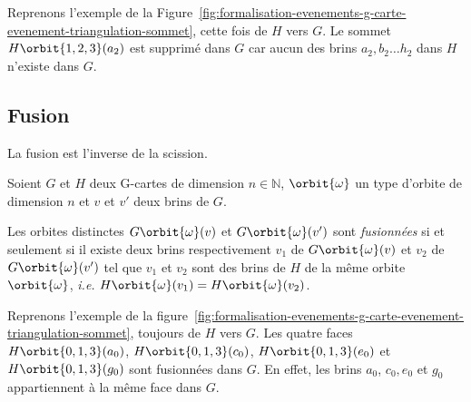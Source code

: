 Reprenons l'exemple de la
Figure~\ref{fig:formalisation-evenements-g-carte-evenement-triangulation-sommet},
cette fois de $H$ vers $G$. %
Le sommet $H\orbit{1,2,3}(a_{2})$ est supprimé dans $G$ car aucun des brins
$a_2,b_2\ldots h_2$ dans $H$ n'existe dans $G$. %


\subsection{Fusion}
\label{sec:formalisation-evenements-transfo-objets-fusion}


La fusion est l'inverse de la scission. %

\begin{definition}
	Soient $G$ et $H$ deux G-cartes de dimension $n \in \mathbb{N}$,
	$\orbit{\omega}$ un type d'orbite de dimension $n$ et $v$ et $v'$ deux brins de $G$. %

	Les orbites distinctes $G\orbit{\omega}(v)$ et $G\orbit{\omega}(v')$ sont
	\emph{fusionnées} si et seulement si il existe deux brins respectivement
	$v_{1}$ de $G\orbit{\omega}(v)$ et $v_{2}$ de $G\orbit{\omega}(v')$ tel que
	$v_{1}$ et $v_{2}$ sont des brins de $H$ de la même orbite $\orbit{\omega}$, \textit{i.e.}
	$H\orbit{\omega}(v_{1}) = H\orbit{\omega}(v_{2})$. %

\end{definition}


Reprenons l'exemple de la figure~\ref{fig:formalisation-evenements-g-carte-evenement-triangulation-sommet}, toujours de $H$ vers $G$.
Les quatre faces $H\orbit{0,1,3}(a_0)$, $H\orbit{0,1,3}(c_0)$, $H\orbit{0,1,3}(e_0)$ et $H\orbit{0,1,3}(g_0)$ sont fusionnées dans $G$. %
En effet, les brins $a_0$, $c_0, e_0$ et $g_0$ appartiennent à la même face dans $G$. %


